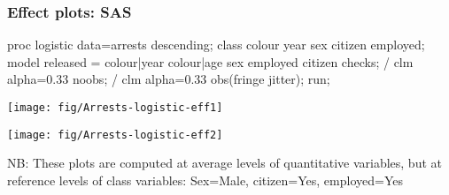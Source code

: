 \renewcommand{\FileName}{effects-Arrests2}

\begin{frame}[fragile]
 \frametitle{Effect plots: SAS}
\begin{Input}[fontsize=\footnotesize,label=\fbox{\texttt{Arrests-logistic.sas}},baselinestretch=0.8]
proc logistic data=arrests descending;
   class colour year sex citizen employed;
   model released =  colour|year colour|age  sex  employed  citizen  checks;
    / clm alpha=0.33 noobs;
    / clm alpha=0.33 obs(fringe jitter);
   run;
\end{Input}
 \begin{minipage}[b]{.5\linewidth}
  \centering
  \texttt{[image: fig/Arrests-logistic-eff1]}
 \end{minipage}%
 \begin{minipage}[b]{.5\linewidth}
  \centering
  \texttt{[image: fig/Arrests-logistic-eff2]}
 \end{minipage}
NB: These plots are computed at \alert{average} levels of quantitative variables, but at \alert{reference}
levels of class variables: Sex=Male, citizen=Yes, employed=Yes

\end{frame}

